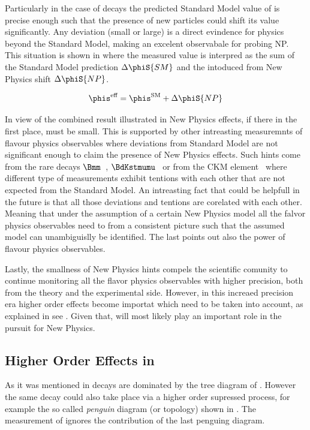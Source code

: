 Particularly in the case of \BsJpsiPhi decays the predicted Standard Model value of  is precise enough
such that the presence of new particles could shift its value ~\cite{Buras:2009if,Chiang:2009ev,Datta:2009fk} significantly.
Any deviation (small or large) is a direct evindence for physics beyond the Standard Model, making \phis an excelent observabale for probing NP.
This situation is shown in  where the measured value  is interpred
as the sum of the Standard Model prediction $\Delta\phiS{SM}$ and the intoduced from New Physics shift $\Delta\phiS{NP}$.

\begin{equation}
 \phis^{\text {eff}} = \phis^{\tiny \text{SM}} + \Delta\phiS{NP}
 \label{phis_meas}
\end{equation}

In view of the combined \phis result illustrated in  New Physics effects, if there in the first place, must be small.
This is supported by other intreasting measuremnts of flavour physics observables where deviations from Standard Model are not significant enough
to claim the presence of New Physics effects. Such hints come from the rare decays $\Bmm$~\cite{CMS:2014xfa}, $\BdKstmumu$~\cite{Aaij:2015oid}
or from the \Vub CKM element~\cite{Aaij:2015bfa} where different type of measurements exhibit tentions with each other that are not expected from the Standard Model.
An intreasting fact that could be helpfull in the future is that all those deviations and tentions are
corelated with each other. Meaning that under the assumption of a certain New Physics model all the falvor physics
observables need to from a consistent picture such that the assumed model can unambiguislly be identified.
The last points out also the power of flavour physics observables.

Lastly, the smallness of New Physics hints compels the scientific comunity to continue monitoring all the
flavor physics observables with higher precision, both from the theory and the experimental side.
However, in this increaed precision era higher order effects become importat which need to be taken into account,
as explained in see . Given that, \phis will most likely play an important role in the
pursuit for New Physics.

\subsection{Higher Order Effects in \phis}
\label{TheBsJpsiKstDecay}
As it was mentioned in  \BsJpsiPhi decays are dominated by the tree diagram of .
However the same decay could also take place via a higher order supressed process, for example the so called {\it penguin} diagram (or topology)
shown in . The \phis measurement of  ignores the contribution of the last penguing diagram.

